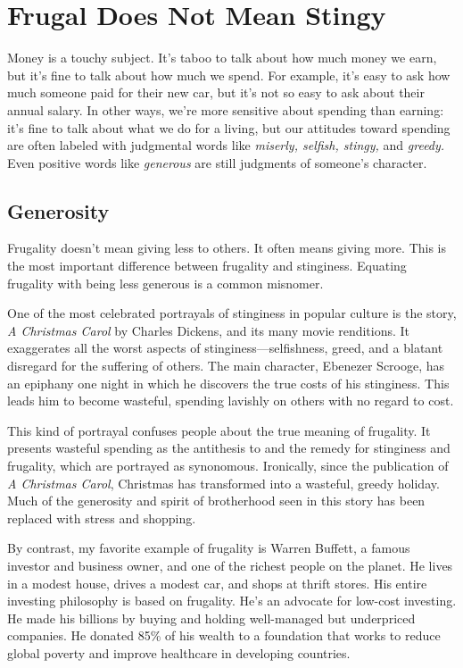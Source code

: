 \chapter{Frugal Does Not Mean Stingy}

Money is a touchy subject. It's taboo to talk about how much money we earn, but it's fine to talk about how much we spend. For example, it's easy to ask how much someone paid for their new car, but it's not so easy to ask about their annual salary. In other ways, we're more sensitive about spending than earning: it's fine to talk about what we do for a living, but our attitudes toward spending are often labeled with judgmental words like \emph{miserly, selfish, stingy,} and \emph{greedy.} Even positive words like \emph{generous} are still judgments of someone's character.

\section{Generosity}
Frugality doesn't mean giving less to others. It often means giving more. This is the most important difference between frugality and stinginess. Eq\-uating frugality with being less generous is a common misnomer.

One of the most celebrated portrayals of stinginess in popular culture is the story, \emph{A Christmas Carol} by Charles Dickens, and its many movie renditions. It exaggerates all the worst aspects of stinginess---selfishness, greed, and a blatant disregard for the suffering of others. The main character, Ebenezer Scrooge, has an epiphany one night in which he discovers the true costs of his stinginess. This leads him to become wasteful, spending lavishly on others with no regard to cost.

This kind of portrayal confuses people about the true meaning of frugality. It presents wasteful spending as the antithesis to and the remedy for stinginess and frugality, which are portrayed as synonomous. Ironically, since the publication of \emph{A Christmas Carol}, Christmas has transformed into a wasteful, greedy holiday. Much of the generosity and spirit of brotherhood seen in this story has been replaced with stress and shopping.

By contrast, my favorite example of frugality is Warren Buffett, a famous investor and business owner, and one of the richest people on the planet. He lives in a modest house, drives a modest car, and shops at thrift stores. His entire investing philosophy is based on frugality. He's an advocate for low-cost investing. He made his billions by buying and holding well-managed but underpriced companies. He donated 85\% of his wealth to a foundation that works to reduce global poverty and improve healthcare in developing countries.

